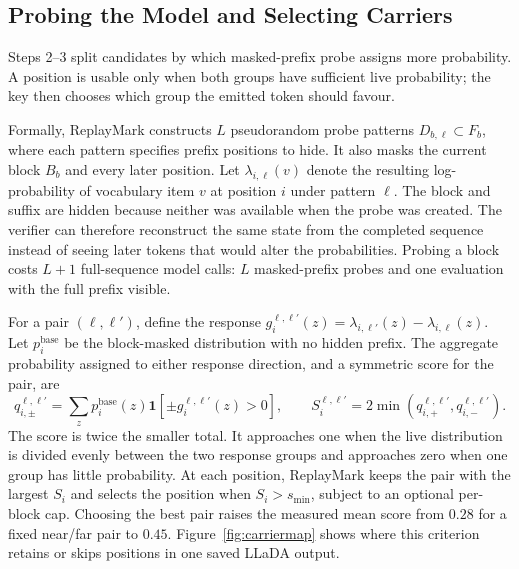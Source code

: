 

\subsection{Probing the Model and Selecting Carriers}
\label{sec:observable}

Steps 2--3 split candidates by which masked-prefix probe assigns more probability. A position is
usable only when both groups have sufficient live probability; the key then chooses which group
the emitted token should favour.

Formally, ReplayMark constructs $L$ pseudorandom probe patterns
$D_{b,\ell}\subset F_b$, where each pattern specifies prefix positions to hide. It also masks the
current block $B_b$ and every later position. Let $\lambda_{i,\ell}(v)$ denote the resulting
log-probability of vocabulary item $v$ at position $i$ under pattern $\ell$.
The block and suffix are hidden because neither was available when the probe was created. The
verifier can therefore reconstruct the same state from the completed sequence instead of seeing
later tokens that would alter the probabilities. Probing a block costs $L+1$ full-sequence model
calls: $L$ masked-prefix probes and one evaluation with the full prefix visible.

For a pair $(\ell,\ell')$, define the response
$g_i^{\ell,\ell'}(z)=\lambda_{i,\ell'}(z)-\lambda_{i,\ell}(z)$. Let
$p_i^{\mathrm{base}}$ be the block-masked distribution with no hidden prefix. The aggregate
probability assigned to either response direction, and a symmetric score for the pair, are
\begin{equation}
q_{i,\pm}^{\ell,\ell'}=\sum_z p_i^{\mathrm{base}}(z)
                  \mathbf{1}[\pm g_i^{\ell,\ell'}(z)>0],\qquad
S_i^{\ell,\ell'}=2\min(q_{i,+}^{\ell,\ell'},q_{i,-}^{\ell,\ell'}).
\label{eq:admission}
\end{equation}
The score is twice the smaller total. It approaches one when the live distribution is divided
evenly between the two response groups and approaches zero when one group has little probability.
At each position, ReplayMark keeps the pair with the largest $S_i$ and selects the position when
$S_i>s_{\min}$, subject to an optional per-block cap. Choosing the best pair raises the measured
mean score from $0.28$ for a fixed near/far pair to $0.45$. Figure~\ref{fig:carriermap} shows where
this criterion retains or skips positions in one saved LLaDA output.


